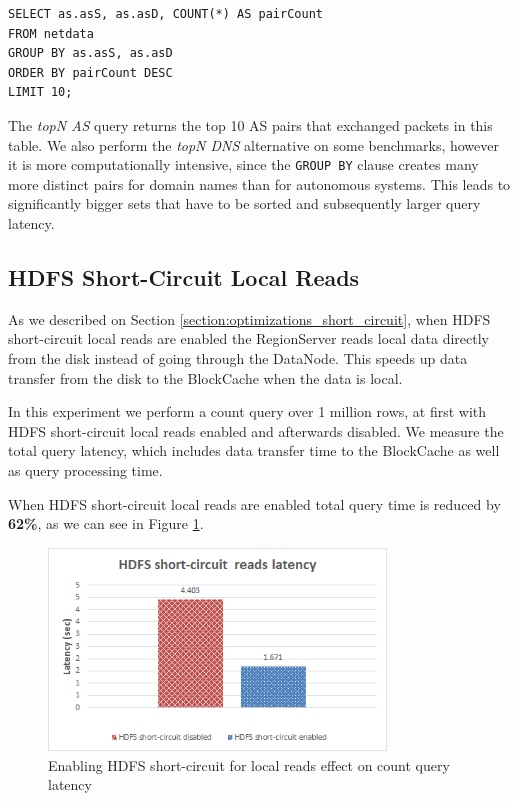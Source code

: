\begin{lstlisting}[language=PhoenixSQL]
SELECT as.asS, as.asD, COUNT(*) AS pairCount
FROM netdata
GROUP BY as.asS, as.asD
ORDER BY pairCount DESC
LIMIT 10;
\end{lstlisting}

The \emph{topN AS} query returns the top 10 AS pairs that exchanged packets in this table. We also perform the \emph{topN DNS} alternative on some benchmarks, however it is more computationally intensive, since the \texttt{GROUP BY} clause creates many more distinct pairs for domain names than for autonomous systems. This leads to significantly bigger sets that have to be sorted and subsequently larger query latency.

\subsection{HDFS Short-Circuit Local Reads}\label{subsection:benchmarks_hbase_short_circuit}

As we described on Section \ref{section:optimizations_short_circuit}, when HDFS short-circuit local reads are enabled the RegionServer reads local data directly from the disk instead of going through the DataNode. This speeds up data transfer from the disk to the BlockCache when the data is local.

In this experiment we perform a count query over 1 million rows, at first with HDFS short-circuit local reads enabled and afterwards disabled. We measure the total query latency, which includes data transfer time to the BlockCache as well as query processing time. 

When HDFS short-circuit local reads are enabled total query time is reduced by \textbf{62\%}, as we can see in Figure \ref{figure:benchmarks_hbase_short_circuit_latency}.

\begin{figure}[H]
\centering
\includegraphics[width=0.8\textwidth]{figures/benchmarks_hbase_short_circuit_latency}
\caption{Enabling HDFS short-circuit for local reads effect on count query latency}
\label{figure:benchmarks_hbase_short_circuit_latency}
\end{figure}

